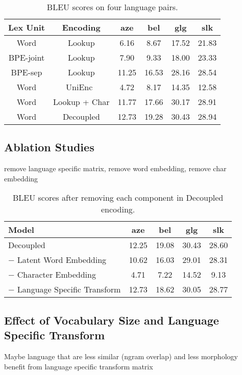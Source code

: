 \begin{table}[h]
    \centering
    \begin{tabular}{cc|cccc}
    Lex Unit & Encoding & aze & bel & glg & slk \\
    \midrule
    Word & Lookup & 6.16 & 8.67 & 17.52 & 21.83 \\
    BPE-joint & Lookup & 7.90 & 9.33 & 18.00 & 23.33 \\
    BPE-sep & Lookup & 11.25 & 16.53 & 28.16 & 28.54 \\
    \midrule
    Word & UniEnc~\citep{universal_nmt} & 4.72 & 8.17 & 14.35  & 12.58 \\
    Word & Lookup + Char & 11.77 & 17.66 & 30.17 & 28.91 \\
    Word & Decoupled & 12.73 & 19.28 & 30.43 & 28.94 \\
    \end{tabular}
    \caption{BLEU scores on four language pairs.}
    \label{tab:results}
\end{table}

\subsection{Ablation Studies}
remove language specific matrix, remove word embedding, remove char embedding
\begin{table}[h]
    \centering
    \begin{tabular}{l|cccc}
    Model & aze & bel & glg & slk \\
    \midrule
    Decoupled & 12.25 & 19.08 & 30.43 & 28.60 \\
    $-$ Latent Word Embedding & 10.62 & 16.03 & 29.01 & 28.31 \\
    $-$ Character Embedding & 4.71 & 7.22 & 14.52 & 9.13 \\
    $-$ Language Specific Transform & 12.73 & 18.62 & 30.05 & 28.77 \\
    \end{tabular}
    \caption{BLEU scores after removing each component in Decoupled encoding.}
    \label{tab:ablate}
\end{table}

\subsection{Effect of Vocabulary Size and Language Specific Transform}
Maybe language that are less similar (ngram overlap) and less morphology benefit from language specific transform matrix 

